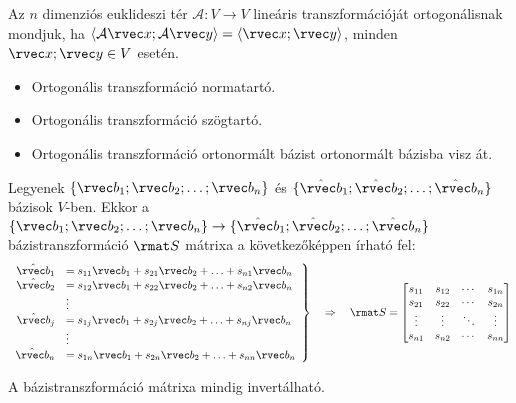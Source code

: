 \begin{definition}
  Az $n$ dimenziós  euklideszi tér $\mathcal A: V \rightarrow V$ lineáris
  transzformációját ortogonálisnak mondjuk, ha $\langle \mathcal A \rvec x;
    \mathcal A \rvec y \rangle = \langle \rvec x; \rvec y \rangle$, minden $\rvec
    x; \rvec y \in V$ esetén.
\end{definition}

\begin{note}
  \begin{itemize}
    \item Ortogonális transzformáció normatartó.

    \item Ortogonális transzformáció szögtartó.

    \item Ortogonális transzformáció ortonormált bázist ortonormált bázisba visz
          át.
  \end{itemize}
\end{note}

\begin{definition}[Bázistranszformáció]
  Legyenek $\{ \rvec b_1; \rvec b_2; \ldots; \rvec b_n \}$ és
  $\{ \hat{\rvec b}_1; \hat{\rvec b}_2; \ldots; \hat{\rvec b}_n \}$ bázisok
  $V$-ben. Ekkor a $\{ \rvec b_1; \rvec b_2; \ldots; \rvec b_n \} \rightarrow
    \{ \hat{\rvec b}_1; \hat{\rvec b}_2; \ldots; \hat{\rvec b}_n \}$
  bázistranszformáció $\rmat S$ mátrixa a következőképpen írható fel:
  $$
    \left.\begin{array}{rl}
      \hat{\rvec b}_1 & = s_{11} \rvec b_1 + s_{21} \rvec b_2 + \ldots + s_{n1} \rvec b_n \\
      \hat{\rvec b}_2 & = s_{12} \rvec b_1 + s_{22} \rvec b_2 + \ldots + s_{n2} \rvec b_n \\
                      & \vdots                                                            \\
      \hat{\rvec b}_j & = s_{1j} \rvec b_1 + s_{2j} \rvec b_2 + \ldots + s_{nj} \rvec b_n \\
                      & \vdots                                                            \\
      \hat{\rvec b}_n & = s_{1n} \rvec b_1 + s_{2n} \rvec b_2 + \ldots + s_{nn} \rvec b_n
    \end{array}\right\}
    \quad\Rightarrow\quad
    \rmat S = \begin{bmatrix}
      s_{11} & s_{12} & \cdots & s_{1n} \\
      s_{21} & s_{22} & \cdots & s_{2n} \\
      \vdots & \vdots & \ddots & \vdots \\
      s_{n1} & s_{n2} & \cdots & s_{nn}
    \end{bmatrix}
  $$
\end{definition}

\begin{statement}
  A bázistranszformáció mátrixa mindig invertálható.
\end{statement}